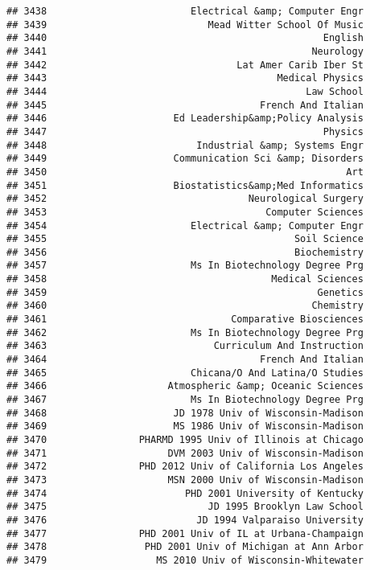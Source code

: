 \documentclass[
]{article}
\begin{document}
\begin{verbatim}
## 3438                         Electrical &amp; Computer Engr
## 3439                            Mead Witter School Of Music
## 3440                                                English
## 3441                                              Neurology
## 3442                                 Lat Amer Carib Iber St
## 3443                                        Medical Physics
## 3444                                             Law School
## 3445                                     French And Italian
## 3446                      Ed Leadership&amp;Policy Analysis
## 3447                                                Physics
## 3448                          Industrial &amp; Systems Engr
## 3449                      Communication Sci &amp; Disorders
## 3450                                                    Art
## 3451                      Biostatistics&amp;Med Informatics
## 3452                                   Neurological Surgery
## 3453                                      Computer Sciences
## 3454                         Electrical &amp; Computer Engr
## 3455                                           Soil Science
## 3456                                           Biochemistry
## 3457                         Ms In Biotechnology Degree Prg
## 3458                                       Medical Sciences
## 3459                                               Genetics
## 3460                                              Chemistry
## 3461                                Comparative Biosciences
## 3462                         Ms In Biotechnology Degree Prg
## 3463                             Curriculum And Instruction
## 3464                                     French And Italian
## 3465                         Chicana/O And Latina/O Studies
## 3466                     Atmospheric &amp; Oceanic Sciences
## 3467                         Ms In Biotechnology Degree Prg
## 3468                      JD 1978 Univ of Wisconsin-Madison
## 3469                      MS 1986 Univ of Wisconsin-Madison
## 3470                PHARMD 1995 Univ of Illinois at Chicago
## 3471                     DVM 2003 Univ of Wisconsin-Madison
## 3472                PHD 2012 Univ of California Los Angeles
## 3473                     MSN 2000 Univ of Wisconsin-Madison
## 3474                        PHD 2001 University of Kentucky
## 3475                            JD 1995 Brooklyn Law School
## 3476                          JD 1994 Valparaiso University
## 3477                PHD 2001 Univ of IL at Urbana-Champaign
## 3478                 PHD 2001 Univ of Michigan at Ann Arbor
## 3479                   MS 2010 Univ of Wisconsin-Whitewater

\end{verbatim}
\end{document}
